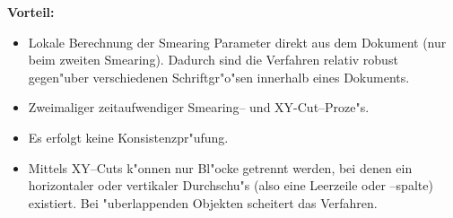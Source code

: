 \begin{enumerate}
          {\bf Vorteil:}
        \begin{itemize}
          \item Lokale Berechnung der Smearing Parameter direkt aus dem Dokument (nur beim zweiten
                Smearing). Dadurch sind die Verfahren relativ robust gegen"uber verschiedenen Schriftgr"o"sen
                innerhalb eines Dokuments.
        \end{itemize}

        \begin{itemize}
          \item Zweimaliger zeitaufwendiger Smearing-- und XY-Cut--Proze"s.
          \item Es erfolgt keine Konsistenzpr"ufung.
          \item Mittels XY--Cuts k"onnen nur Bl"ocke getrennt werden, bei denen ein horizontaler
                oder vertikaler Durchschu"s (also eine Leerzeile oder --spalte) existiert. Bei "uberlappenden
                Objekten scheitert das Verfahren.
        \end{itemize}
\end{enumerate}